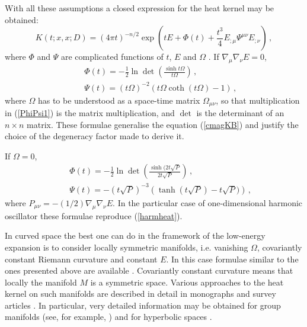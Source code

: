 With all these assumptions a closed expression for the heat kernel
may be obtained:
\begin{equation}
K(t;x,x;D)=(4\pi t)^{-n/2} \exp \left(
tE +\Phi (t) +\frac {t^3}4 E_{;\mu} \Psi^{\mu\nu} E_{;\nu} \right)\,,
\label{avrahk}
\end{equation}
where $\Phi$ and $\Psi$ are complicated functions of $t$, $E$ and $\Omega$
\cite{Avramidi:1995ik}. If $\nabla_\mu\nabla_\nu E=0$,
\begin{eqnarray}
&&\Phi (t)=-\frac 12 \ln \det \left( \frac{\sinh t \Omega}{t\Omega}
\right) \,,\nonumber\\
&&\Psi (t) = (t\Omega )^{-2} \left( t\Omega \coth (t\Omega )-1
\right) \,,\label{PhiPsi1}
\end{eqnarray}
where $\Omega$ has to be understood as a space-time matrix
$\Omega_{\mu\nu}$, so that multiplication in (\ref{PhiPsi1})
is the matrix multiplication, and $\det$ is the determinant
of an $n\times n$ matrix. These formulae generalise the equation
(\ref{cmagKB}) and justify the choice of the degeneracy factor made
to derive it.

If $\Omega =0$,
\begin{eqnarray}
&&\Phi (t) = -\frac 12 \ln \det \left( 
\frac{\sinh (2t\sqrt{P}}{2t\sqrt{P}} \right) \,,\nonumber\\
&&\Psi (t) = -\left( t\sqrt{P} \right)^{-3}
\left( \tanh (t\sqrt{P}) -t\sqrt{P}) \right) \,,\label{PhiPsi2}
\end{eqnarray}
where $P_{\mu\nu}=-(1/2)\nabla_\mu\nabla_\nu E$. In the particular
case of one-dimensional harmonic oscillator these formulae
reproduce (\ref{harmheat}). 

In curved space the best one can do in the framework of the
low-energy expansion is to consider
locally symmetric manifolds, i.e. vanishing $\Omega$,
covariantly constant Riemann curvature and constant $E$. 
In this case formulae similar to the ones presented above
are available \cite{Avramidi:1994zc,Avramidi:1996zp}.
Covariantly constant curvature means that locally 
the manifold $M$ is a symmetric space. Various approaches
to the heat kernel on such manifolds are described in detail
in monographs and survey articles 
\cite{Hurt:1983,Camporesi:1990wm,Bytsenko:2001xs}. In particular,
very detailed information may be obtained for group manifolds
(see, for example, \cite{Dowker:1971vu}) and for hyperbolic
spaces \cite{Bytsenko:1996bc}.
